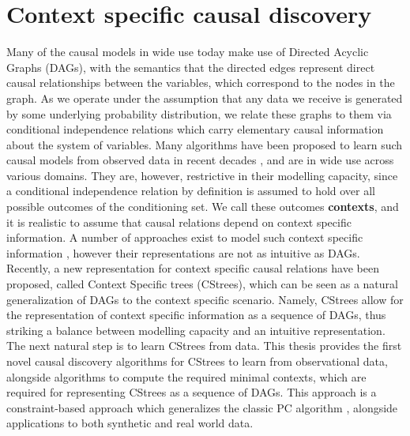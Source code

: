 \documentclass{tufte-book}
\begin{document}
\section{Context specific causal discovery}
\label{sec:orgf8556a7}
Many of the causal models in wide use today make use of Directed Acyclic Graphs (DAGs), with the semantics that the directed edges represent direct causal relationships between the variables, which correspond to the nodes in the graph. As we operate under the assumption that any data we receive is generated by some underlying probability distribution, we relate these graphs to them via conditional independence relations which carry elementary causal information about the system of variables. Many algorithms have been proposed to learn such causal models from observed data in recent decades \cite{chickering-2002-optimal,spirtes-1991-algor-fast,solus-2021-consis-guaran,tsamardinos-2006-max-min-hill}, and are in wide use across various domains. They are, however, restrictive in their modelling capacity, since a conditional independence relation by definition is assumed to hold over all possible outcomes of the conditioning set. We call these outcomes \textbf{contexts}, and it is realistic to assume that causal relations depend on context specific information. A number of approaches exist to model such context specific information \cite{collazo-2018-chain,silander-2013,thwaites-2010-causal-analy,goergen-2017-equiv-class}, however their representations are not as intuitive as DAGs. Recently, a new representation for context specific causal relations have been proposed, called Context Specific trees (CStrees), which can be seen as a natural generalization of DAGs to the context specific scenario. Namely, CStrees allow for the representation of context specific information as a sequence of DAGs, thus striking a balance between modelling capacity and an intuitive representation. The next natural step is to learn CStrees from data. This thesis provides the first novel causal discovery algorithms for CStrees to learn from observational data, alongside algorithms to compute the required minimal contexts, which are required for representing CStrees as a sequence of DAGs. This approach is a constraint-based approach which generalizes the classic PC algorithm \cite{spirtes-1991-algor-fast}, alongside applications to both synthetic and real world data.
\end{document}
